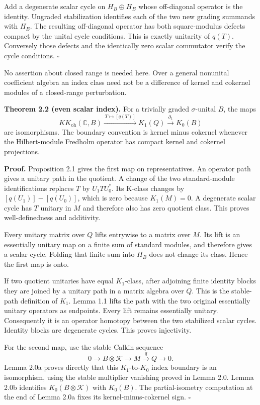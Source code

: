 \documentclass[
  11pt,
]{article}
\begin{document}
Add a degenerate scalar cycle on \(H_B\oplus H_B\) whose off-diagonal
operator is the identity. Ungraded stabilization identifies each of the
two new grading summands with \(H_B\). The resulting off-diagonal
operator has both square-modulus defects compact by the unital cycle
conditions. This is exactly unitarity of \(q(T)\). Conversely those
defects and the identically zero scalar commutator verify the cycle
conditions. \(\square\)

No assertion about closed range is needed here. Over a general nonunital
coefficient algebra an index class need not be a difference of kernel
and cokernel modules of a closed-range perturbation.

\textbf{Theorem 2.2 (even scalar index).} For a trivially graded
\(\sigma\)-unital \(B\), the maps \[
KK_{\mathrm{oh}}(\mathbb C,B)
\xrightarrow{\,T\mapsto[q(T)]\,}K_1(Q)
\xrightarrow{\partial_1}K_0(B)
\tag{2.4}
\] are isomorphisms. The boundary convention is kernel minus cokernel
whenever the Hilbert-module Fredholm operator has compact kernel and
cokernel projections.

\textbf{Proof.} Proposition 2.1 gives the first map on representatives.
An operator path gives a unitary path in the quotient. A change of the
two standard-module identifications replaces \(T\) by \(U_1TU_0^*\). Its
K-class changes by \([q(U_1)]-[q(U_0)]\), which is zero because
\(K_1(M)=0\). A degenerate scalar cycle has \(T\) unitary in \(M\) and
therefore also has zero quotient class. This proves well-definedness and
additivity.

Every unitary matrix over \(Q\) lifts entrywise to a matrix over \(M\).
Its lift is an essentially unitary map on a finite sum of standard
modules, and therefore gives a scalar cycle. Folding that finite sum
into \(H_B\) does not change its class. Hence the first map is onto.

If two quotient unitaries have equal \(K_1\)-class, after adjoining
finite identity blocks they are joined by a unitary path in a matrix
algebra over \(Q\). This is the stable-path definition of \(K_1\). Lemma
1.1 lifts the path with the two original essentially unitary operators
as endpoints. Every lift remains essentially unitary. Consequently it is
an operator homotopy between the two stabilized scalar cycles. Identity
blocks are degenerate cycles. This proves injectivity.

For the second map, use the stable Calkin sequence \[
0\longrightarrow B\otimes\mathcal K
\longrightarrow M
\xrightarrow q Q\longrightarrow0.
\tag{2.5}
\] Lemma 2.0a proves directly that this \(K_1\)-to-\(K_0\) index
boundary is an isomorphism, using the stable multiplier vanishing proved
in Lemma 2.0. Lemma 2.0b identifies \(K_0(B\otimes\mathcal K)\) with
\(K_0(B)\). The partial-isometry computation at the end of Lemma 2.0a
fixes its kernel-minus-cokernel sign. \(\square\)
\end{document}
